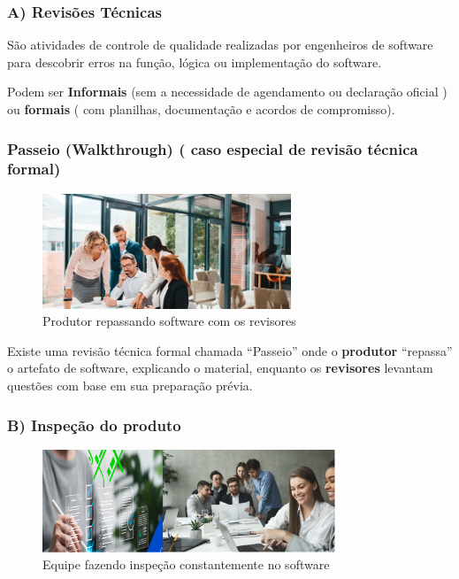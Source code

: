 \documentclass[
]{book}
\begin{document}
\subsubsection{A) Revisões Técnicas}\label{a-revisuxf5es-tuxe9cnicas}

São atividades de controle de qualidade realizadas por engenheiros de software para descobrir erros na função, lógica ou implementação do software.

Podem ser \textbf{Informais} (sem a necessidade de agendamento ou declaração oficial ) ou \textbf{formais} ( com planilhas, documentação e acordos de compromisso).

\subsubsection{Passeio (Walkthrough) ( caso especial de revisão técnica formal)}\label{passeio-walkthrough-caso-especial-de-revisuxe3o-tuxe9cnica-formal}

\begin{figure}
\centering
\includegraphics[width=2.92708in,height=\textheight]{images/clipboard-4226843625.png}
\caption{Produtor repassando software com os revisores}
\end{figure}

Existe uma revisão técnica formal chamada ``Passeio'' onde o \textbf{produtor} ``repassa'' o artefato de software, explicando o material, enquanto os \textbf{revisores} levantam questões com base em sua preparação prévia.

\subsubsection{B) Inspeção do produto}\label{b-inspeuxe7uxe3o-do-produto}

\begin{figure}
\centering
\includegraphics[width=3.44792in,height=\textheight]{images/clipboard-406807059.png}
\caption{Equipe fazendo inspeção constantemente no software}
\end{figure}
\end{document}
